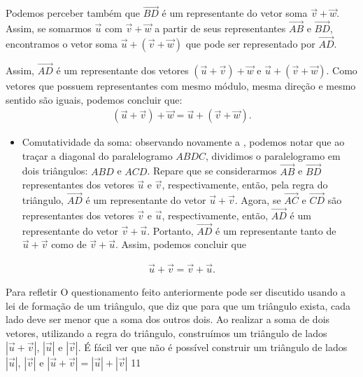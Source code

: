 Podemos perceber também que \(\overrightarrow{BD}\) é um representante do vetor soma \(\vec{v} + \vec{w}\). Assim, se somarmos \(\vec{u}\) com \(\vec{v} + \vec{w}\) a partir de seus representantes \(\overrightarrow{AB}\)  e \(\overrightarrow{BD}\), encontramos o vetor soma \(\vec{u} + (\vec{v}+\vec{w})\) que pode ser representado por \(\overrightarrow{AD}\).

Assim, \(\overrightarrow{AD}\) é um representante dos vetores \((\vec{u} + \vec{v})+\vec{w}\) e \(\vec{u} + (\vec{v}+\vec{w})\). Como vetores que possuem representantes com mesmo módulo, mesma direção e mesmo sentido são iguais, podemos concluir que:
\begin{equation*}
\begin{split}(\vec{u} + \vec{v}) + \vec{w} = \vec{u} + (\vec{v} + \vec{w}).\end{split}
\end{equation*}\begin{itemize}
\item {} 
Comutatividade da soma: observando novamente a , podemos notar que ao traçar a diagonal do paralelogramo \(ABDC\), dividimos o paralelogramo em dois triângulos: \(ABD\) e \(ACD\). Repare que se considerarmos \(\overrightarrow{AB}\) e \(\overrightarrow{BD}\) representantes dos vetores \(\vec{u}\) e \(\vec{v}\), respectivamente, então, pela regra do triângulo, \(\overrightarrow{AD}\) é um representante do vetor \(\vec{u}+\vec{v}\). Agora, se \(\overrightarrow{AC}\) e \(\overrightarrow{CD}\) são representantes dos vetores \(\vec{v}\) e \(\vec{u}\), respectivamente, então, \(\overrightarrow{AD}\) é um representante do vetor \(\vec{v}+\vec{u}\). Portanto, \(\overrightarrow{AD}\) é um representante tanto de \(\vec{u}+\vec{v}\) como de \(\vec{v}+\vec{u}\). Assim, podemos concluir que

\end{itemize}
\begin{equation*}
\begin{split}\vec{u} + \vec{v} = \vec{v} + \vec{u}.\end{split}
\end{equation*}

\begin{objectives}{Para refletir}
{O questionamento feito anteriormente pode ser discutido usando a lei de formação de um triângulo, que diz que para que um triângulo exista, cada lado deve ser menor que a soma dos outros dois. Ao realizar a soma de dois vetores, utilizando a regra do triângulo, construímos um triângulo de lados \(|\vec{u}+\vec{v}|\), \(|\vec{u}|\) e  \(|\vec{v}|\). É fácil ver que não é possível construir um triângulo de lados  \(|\vec{u}|\), \(|\vec{v}|\) e \(|\vec{u}+\vec{v}|=|\vec{u}|+|\vec{v}|\)}
{1}{1}
\end{objectives}


